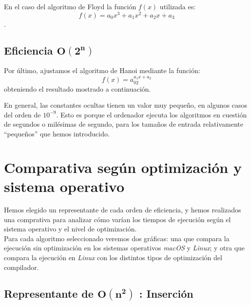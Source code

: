 \documentclass[11pt]{article}
\begin{document}
En el caso del algoritmo de Floyd la función $f(x)$ utilizada es: $$f(x) = a_0x^3 + a_1x^2 + a_2x + a_3$$.
\begin{adjustbox}{center}
	\fontsize{8pt}{7.2}\selectfont
	\resizebox*{13cm}{!}{
				
			}
\end{adjustbox}

\subsection*{Eficiencia $\boldsymbol{O(2^n)}$}

Por último, ajustamos el algoritmo de Hanoi mediante la función: $$f(x) = a_02^{a_{1}x + a_2}$$ obteniendo el resultado mostrado a continuación.
 
\begin{center}
	
\end{center}

En general, las constantes ocultas tienen un valor muy pequeño, en algunos casos del orden de $10^{-9}$. Esto es porque el ordenador ejecuta los algoritmos en cuestión de segundos o milésimas de segundo, para los tamaños de entrada relativamente “pequeños” que hemos introducido.

\newpage

\section*{Comparativa según optimización y sistema operativo}
Hemos elegido un representante de cada orden de eficiencia, y hemos realizados una comprativa para analizar cómo varían los tiempos de ejecución según el sistema operativo y el nivel de optimización.\\

Para cada algoritmo seleccionado veremos dos gráficas: una que compara la ejecución sin optimización en los sistemas operativos \textit{macOS} y \textit{Linux}; y otra que compara la ejecución en \textit{Linux} con los distintos tipos de optimización del compilador.

\subsection*{Representante de $\boldsymbol{O(n^2)}$ : Inserción}
	\begin{center}
		
	\end{center}

	\begin{center}
		
	\end{center}
\end{document}
